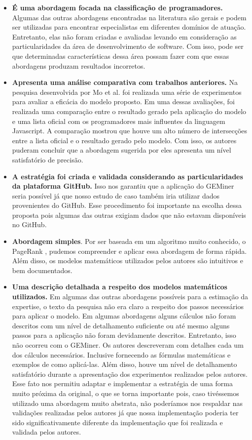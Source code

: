 \begin{itemize}
\item \textbf{É uma abordagem focada na classificação de programadores.} Algumas das outras abordagens encontradas na literatura são gerais e podem ser utilizadas para encontrar especialistas em diferentes domínios de atuação. Entretanto, elas não foram criadas e avaliadas levando em consideração as particularidades da área de desenvolvimento de software. Com isso, pode ser que determinadas características dessa área possam fazer com que essas abordagens produzam resultados incorretos.
\item \textbf{Apresenta uma análise comparativa com trabalhos anteriores.} Na pesquisa desenvolvida por  Mo et al.\cite{mo2015geminer} foi realizada uma série de experimentos para avaliar a eficácia do modelo proposto. Em uma dessas avaliações, foi realizada uma comparação entre o resultado gerado pela aplicação do modelo e uma lista oficial com os programadores mais influentes da linguagem Javascript. A comparação mostrou que houve um alto número de intersecções entre a lista oficial e o resultado gerado pelo modelo. Com isso, os autores puderam concluir que a abordagem sugerida por eles apresenta um nível satisfatório de precisão. 
\item \textbf{A estratégia foi criada e validada considerando as particularidades da plataforma GitHub.} Isso nos garantiu que a aplicação do GEMiner seria possível já que nosso estudo de caso também iria utilizar dados provenientes do GitHub. Esse procedimento foi importante na escolha dessa proposta pois algumas das outras exigiam dados que não estavam disponíveis no GitHub.
\item \textbf{Abordagem simples}. Por ser baseada em um algoritmo muito conhecido, o  PageRank \cite{page1999pagerank},  pudemos compreender e aplicar essa abordagem de forma rápida. Além disso, os modelos matemáticos utilizados pelos autores são intuitivos e bem documentados.
\item \textbf{Uma descrição detalhada a respeito dos modelos matemáticos utilizados.} Em algumas das outras abordagens possíveis para a estimação da expertise, o texto da pesquisa não era claro a respeito dos passos necessários para aplicar o modelo. Em algumas abordagens alguns cálculos não foram descritos com um nível de detalhamento suficiente ou até mesmo alguns passos para a aplicação não foram devidamente descritos. Entretanto, isso não ocorreu com o GEMiner. Os autores descreveram com detalhes cada um dos cálculos necessários. Inclusive fornecendo as fórmulas matemáticas e exemplos de como aplicá-las. Além disso, houve um nível de detalhamento satisfatório durante a apresentação dos experimentos realizados pelos autores. Esse fato nos permitiu adaptar e implementar a estratégia de uma forma muito próxima da original, o que se torna importante pois, caso tivéssemos utilizado uma abordagem muito abstrata, não poderíamos nos respaldar nas validações realizadas pelos autores já que nossa implementação poderia ter sido significativamente diferente da implementação que foi realizada e validada pelos autores.

\end{itemize}
